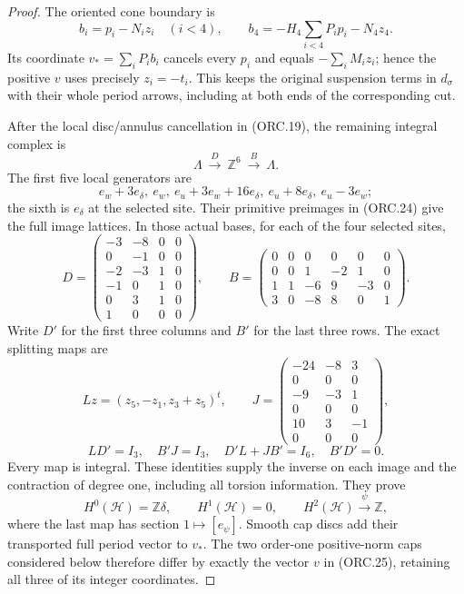 \begin{proof}
The oriented cone boundary is
\[
b_i=p_i-N_iz_i\quad(i<4),\qquad
b_4=-H_4\sum_{i<4}P_ip_i-N_4z_4.
\tag{ORC.26}
\]
Its coordinate \(v_*=\sum_iP_ib_i\) cancels every \(p_i\)
and equals \(-\sum_iM_iz_i\); hence the positive \(v\)
uses precisely \(z_i=-t_i\). This keeps the original
suspension terms in \(d_\sigma\) with their whole period
arrows, including at both ends of the corresponding cut.

After the local disc/annulus cancellation in (ORC.19), the
remaining integral complex is
\[
\Lambda\ \xrightarrow{D}\ \mathbb Z^6\
 \xrightarrow{B}\ \Lambda .
\tag{ORC.27}
\]
The first five local generators are
\[
e_w+3e_\delta,\ e_w,\ e_u+3e_w+16e_\delta,\
e_u+8e_\delta,\ e_u-3e_w;
\]
the sixth is \(e_\delta\) at the selected site. Their primitive
preimages in (ORC.24) give the full image lattices. In those
actual bases, for each of the four selected sites,
\[
D=\begin{pmatrix}
-3&-8&0&0\\0&-1&0&0\\-2&-3&1&0\\
-1&0&1&0\\0&3&1&0\\1&0&0&0
\end{pmatrix},\qquad
B=\begin{pmatrix}
0&0&0&0&0&0\\0&0&1&-2&1&0\\
1&1&-6&9&-3&0\\3&0&-8&8&0&1
\end{pmatrix}.
\tag{ORC.28}
\]
Write \(D'\) for the first three columns and \(B'\) for the
last three rows. The exact splitting maps are
\[
Lz=(z_5,-z_1,z_3+z_5)^t,\qquad
J=\begin{pmatrix}
-24&-8&3\\0&0&0\\-9&-3&1\\0&0&0\\
10&3&-1\\0&0&0
\end{pmatrix},
\tag{ORC.29}
\]
\[
LD'=I_3,\quad B'J=I_3,\quad
D'L+JB'=I_6,\quad B'D'=0.
\tag{ORC.30}
\]
Every map is integral. These identities supply the inverse
on each image and the contraction of degree one, including
all torsion information. They prove
\[
H^0(\mathscr H)=\mathbb Z\delta,\qquad
H^1(\mathscr H)=0,\qquad
H^2(\mathscr H)\xrightarrow{\psi}\mathbb Z ,
\tag{ORC.31}
\]
where the last map has section \(1\mapsto[e_\psi]\).
Smooth cap discs add their transported full period vector
to \(v_*\). The two order-one positive-norm caps considered
below therefore differ by exactly the vector \(v\) in
(ORC.25), retaining all three of its integer coordinates.


\end{proof}
